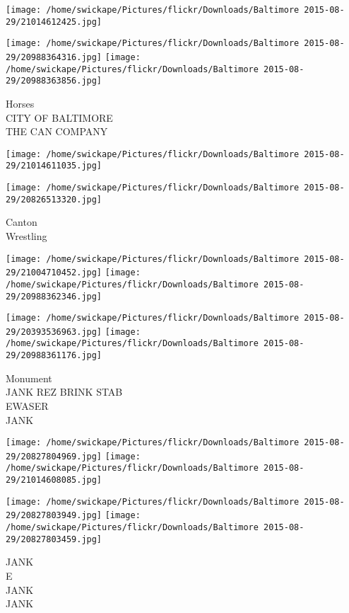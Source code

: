 \documentclass[10pt,letterpaper]{article}
\begin{document}
\texttt{[image: /home/swickape/Pictures/flickr/Downloads/Baltimore 2015-08-29/21014612425.jpg]}

\vspace{0.25in}
\texttt{[image: /home/swickape/Pictures/flickr/Downloads/Baltimore 2015-08-29/20988364316.jpg]}
\texttt{[image: /home/swickape/Pictures/flickr/Downloads/Baltimore 2015-08-29/20988363856.jpg]}

Horses\\
CITY OF BALTIMORE\\
THE CAN COMPANY
\pagebreak

\texttt{[image: /home/swickape/Pictures/flickr/Downloads/Baltimore 2015-08-29/21014611035.jpg]}

\vspace{0.25in}
\texttt{[image: /home/swickape/Pictures/flickr/Downloads/Baltimore 2015-08-29/20826513320.jpg]}

Canton\\
Wrestling
\pagebreak

\texttt{[image: /home/swickape/Pictures/flickr/Downloads/Baltimore 2015-08-29/21004710452.jpg]}
\texttt{[image: /home/swickape/Pictures/flickr/Downloads/Baltimore 2015-08-29/20988362346.jpg]}

\texttt{[image: /home/swickape/Pictures/flickr/Downloads/Baltimore 2015-08-29/20393536963.jpg]}
\texttt{[image: /home/swickape/Pictures/flickr/Downloads/Baltimore 2015-08-29/20988361176.jpg]}

Monument\\
JANK REZ BRINK STAB\\
EWASER\\
JANK
\pagebreak

\texttt{[image: /home/swickape/Pictures/flickr/Downloads/Baltimore 2015-08-29/20827804969.jpg]}
\texttt{[image: /home/swickape/Pictures/flickr/Downloads/Baltimore 2015-08-29/21014608085.jpg]}

\texttt{[image: /home/swickape/Pictures/flickr/Downloads/Baltimore 2015-08-29/20827803949.jpg]}
\texttt{[image: /home/swickape/Pictures/flickr/Downloads/Baltimore 2015-08-29/20827803459.jpg]}

JANK\\
E\\
JANK\\
JANK
\pagebreak
\end{document}
